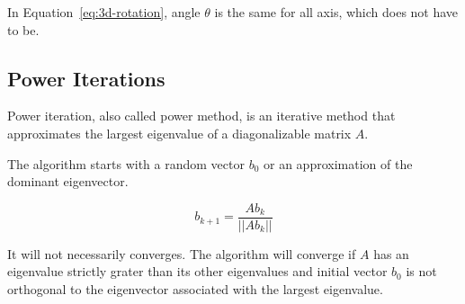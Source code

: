 In Equation~\ref{eq:3d-rotation}, angle $\theta$ is the same for all axis, which does not have to be.


\subsection{Power Iterations}
\label{sec:powerIterations}

Power iteration, also called power method, is an iterative method
that approximates the largest eigenvalue of a diagonalizable matrix $A$.

The algorithm starts with a random vector $b_0$ or an approximation of the dominant eigenvector.

\begin{equation}
    \label{eq:powerIterations}
    b_{k+1} = \frac{Ab_k}{||Ab_k||}
\end{equation}

It will not necessarily converges. The algorithm will converge if $A$ has an eigenvalue strictly grater than its other eigenvalues
and initial vector $b_0$ is not orthogonal to the eigenvector associated with the largest eigenvalue.
